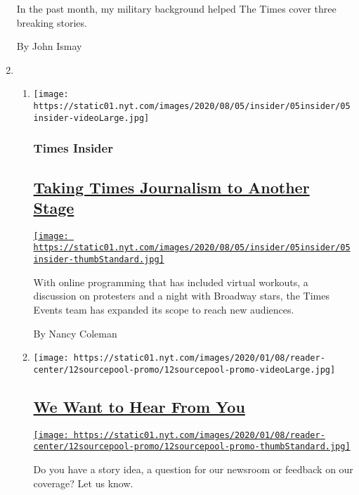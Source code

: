 \begin{enumerate}
  In the past month, my military background helped The Times cover three
  breaking stories.

  By John Ismay
\item
  \begin{enumerate}
  \def\labelenumii{\arabic{enumii}.}
  \item
    \texttt{[image: https://static01.nyt.com/images/2020/08/05/insider/05insider/05insider-videoLarge.jpg]}

    \hypertarget{times-insider-2}{%
    \subsubsection{Times Insider}\label{times-insider-2}}

    \hypertarget{taking-times-journalism-to-another-stage}{%
    \subsection{\texorpdfstring{\href{/2020/08/05/insider/times-events.html}{Taking
    Times Journalism to Another
    Stage}}{Taking Times Journalism to Another Stage}}\label{taking-times-journalism-to-another-stage}}

    \href{/2020/08/05/insider/times-events.html}{\texttt{[image: https://static01.nyt.com/images/2020/08/05/insider/05insider/05insider-thumbStandard.jpg]}}

    With online programming that has included virtual workouts, a
    discussion on protesters and a night with Broadway stars, the Times
    Events team has expanded its scope to reach new audiences.

    By Nancy Coleman
  \item
    \texttt{[image: https://static01.nyt.com/images/2020/01/08/reader-center/12sourcepool-promo/12sourcepool-promo-videoLarge.jpg]}

    \hypertarget{we-want-to-hear-from-you}{%
    \subsection{\texorpdfstring{\href{/2019/10/15/homepage/contact-newsroom.html}{We
    Want to Hear From
    You}}{We Want to Hear From You}}\label{we-want-to-hear-from-you}}

    \href{/2019/10/15/homepage/contact-newsroom.html}{\texttt{[image: https://static01.nyt.com/images/2020/01/08/reader-center/12sourcepool-promo/12sourcepool-promo-thumbStandard.jpg]}}

    Do you have a story idea, a question for our newsroom or feedback on
    our coverage? Let us know.
  \end{enumerate}
\end{enumerate}

